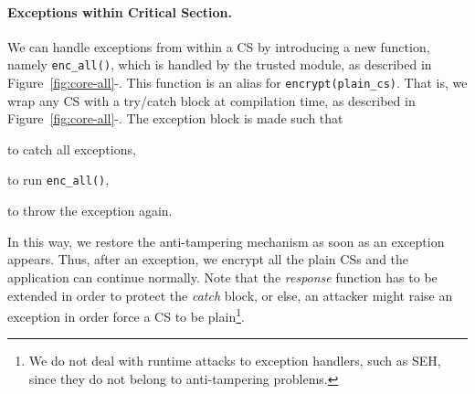 \paragraph{Exceptions within Critical Section.}
We can handle exceptions from within a CS by introducing a new function, namely 
\texttt{enc\_all()}, which is handled by the trusted module, as described in 
Figure~\ref{fig:core-all}-.
This function is an alias for \texttt{encrypt(plain\_cs)}.
That is, we wrap any CS with a try/catch block at compilation time, as 
described in Figure~\ref{fig:core-all}-.
The exception block is made such that
\begin{enumerate*}[label=(\roman*)]
	\item to catch all exceptions, 
	\item to run \texttt{enc\_all()},
	\item to throw the exception again.
\end{enumerate*}
In this way, we restore the anti-tampering mechanism as soon as an exception 
appears. 
Thus, after an exception, we encrypt all the plain CSs and the application can 
continue normally.
Note that the \emph{response} function has to be extended in order to protect 
the \emph{catch} block,
or else, an attacker might raise an exception in order force a CS to be 
plain\footnote{We do not deal with runtime attacks to exception handlers, such 
as SEH, since they do not belong to anti-tampering problems.}.


